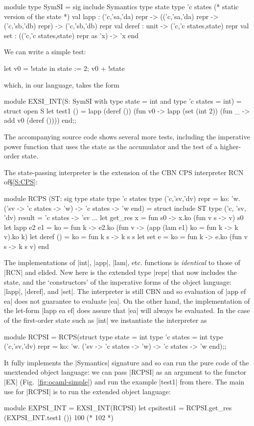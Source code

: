 \begin{code}
module type SymSI = sig
  include Symantics
  type state
  type 'c states	(* static version of the state *)
  val lapp : ('c,'sa,'da) repr -> 
             (('c,'sa,'da) repr -> ('c,'sb,'db) repr) ->
             ('c,'sb,'db) repr
  val deref : unit -> ('c,'c states,state) repr
  val set   : (('c,'c states,state) repr as 'x) -> 'x
end
\end{code}

We can write a simple test: 
\begin{code}
let v0 = !state in state := 2; v0 + !state
\end{code}
which, in our language, takes the form
\begin{code}
module EXSI_INT(S: SymSI with type state = int and type 'c states = int) = 
struct
  open S
  let test1 () = lapp (deref ()) (fun v0 -> 
                  lapp (set (int 2)) (fun _ ->
		   add v0 (deref ())))
end;;
\end{code}
The accompanying source code shows several more tests, including the
imperative power function that uses the state as the accumulator and
the test of a higher-order state.

The state-passing interpreter is the extension of the CBN CPS
interpreter RCN of\S\ref{S:CPS}:
\begin{code}
module RCPS (ST: sig 
  type state 
  type 'c states 
  type ('c,'sv,'dv) repr = 
      {ko: 'w. ('sv -> 'c states -> 'w) -> 'c states -> 'w}
end) = struct
  include ST
  type ('c, 'sv, 'dv) result = 'c states -> 'sv
  ... 
  let get_res x = fun s0 -> x.ko (fun v s -> v) s0
  let lapp e2 e1 = 
    {ko = fun k -> e2.ko (fun v -> (app (lam e1) {ko = fun k -> k v}).ko k)}
  let deref () = {ko = fun k s -> k s s}
  let set e = {ko = fun k -> e.ko (fun v s -> k s v)}
end
\end{code}
The implementations of |int|, |app|, |lam|, etc. functions is \emph{identical}
to those of |RCN| and elided. New here is the extended type |repr|
that now includes the state, and the `constructors' of the imperative
forms of the object language: |lapp|, |deref|, and |set|. The
interpreter is still CBN and so evaluation of |app ef ea| does not
guarantee to evaluate |ea|. On the other hand, the implementation of
the let-form |lapp ea ef| does assure that |ea| will always be
evaluated. In the case of the first-order state such as |int| we 
instantiate the interpreter as
\begin{code}
module RCPSI = RCPS(struct 
  type state = int
  type 'c states = int
  type ('c,'sv,'dv) repr = 
      {ko: 'w. ('sv -> 'c states -> 'w) -> 'c states -> 'w}
end);;
\end{code}
It fully implements the |Symantics| signature and so can run the pure
code of the unextended object language: we can pass |RCPSI| as an
argument to the functor |EX| (Fig.~\ref{fig:ocaml-simple}) and run 
the example |test1| from there. The main use for |RCPSI| is to run the 
extended object language:
\begin{code}
module EXPSI_INT = EXSI_INT(RCPSI)
let cpsitesti1 = RCPSI.get_res (EXPSI_INT.test1 ()) 100 (* 102 *)
\end{code}

